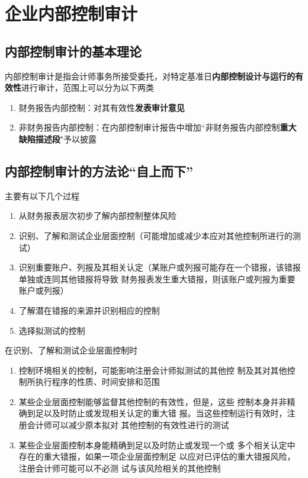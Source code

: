 \documentclass[UTF8,12pt]{ctexart}
\numberwithin{equation}{section} %
\numberwithin{figure}{section}
\numberwithin{table}{section}
\begin{document}
	\newpage
	\section{企业内部控制审计}
	
	\subsection{内部控制审计的基本理论}
	内部控制审计是指会计师事务所接受委托，对特定基准日\textbf{内部控制设计与运行的有效性}进行审计，范围上可以分为以下两类
	\begin{enumerate}
		\item 财务报告内部控制：对其有效性\textbf{发表审计意见}
		
		\item 非财务报告内部控制：在内部控制审计报告中增加“非财务报告内部控制\textbf{重大缺陷描述段}"予以披露
	\end{enumerate}
	
	\subsection{内部控制审计的方法论“自上而下”}
	主要有以下几个过程
	\begin{enumerate}
		\item 从财务报表层次初步了解内部控制整体风险
		
		\item 识别、了解和测试企业层面控制（可能增加或减少本应对其他控制所进行的测试）
		
		\item 识别重要账户、列报及其相关认定（某账户或列报可能存在一个错报，该错报单独或连同其他错报将导致 财务报表发生重大错报，则该账户或列报为重要账户或列报）
		
		\item 了解潜在错报的来源并识别相应的控制
		
		\item 选择拟测试的控制
	\end{enumerate}
	
	在识别、了解和测试企业层面控制时
	\begin{enumerate}
		\item 控制环境相关的控制，可能影响注册会计师拟测试的其他控 制及其对其他控制所执行程序的性质、时间安排和范围 
		
		\item 某些企业层面控制能够监督其他控制的有效性，但是，这些 控制本身并非精确到足以及时防止或发现相关认定的重大错 报。当这些控制运行有效时，注册会计师可以减少原本拟对 其他控制的有效性进行的测试 
		
		\item 某些企业层面控制本身能精确到足以及时防止或发现一个或 多个相关认定中存在的重大错报，如果一项企业层面控制足 以应对已评估的重大错报风险，注册会计师可能可以不必测 试与该风险相关的其他控制
	\end{enumerate}
	
\end{document}
